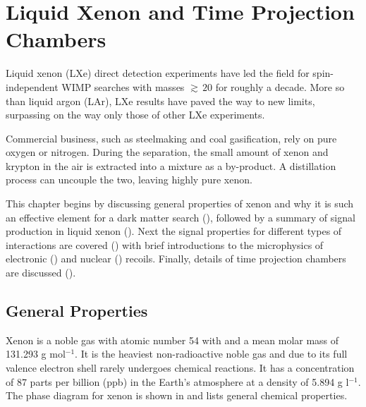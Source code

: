 

\pagestyle{cu}
\graphicspath{{./Chapter2/Figures/}}
\chapter[Liquid Xenon and Time Projection Chambers][Liquid Xenon and Time Projection Chambers]{Liquid Xenon and Time Projection Chambers}
\label{chap:liquid_xe}

Liquid xenon (LXe) direct detection experiments have led the field for spin-independent WIMP searches with masses ${\gtrsim}\, 20$ for
roughly a decade.  More so than liquid argon (LAr), LXe results have paved the way to new limits, surpassing on the way only those of
other LXe experiments.

Commercial business, such as steelmaking and coal gasification, rely on pure oxygen or nitrogen.  During the separation,
the small amount of xenon and krypton in the air is extracted into a mixture as a by-product.  A distillation process can uncouple
the two, leaving highly pure xenon.

This chapter begins by discussing general properties of xenon and why it is such an effective element for a dark matter search
(), followed by a summary of signal production in liquid xenon ().  Next the signal
properties for different types of interactions are covered () with brief introductions to the microphysics of
electronic () and nuclear () recoils.  Finally, details of time projection chambers are discussed
().

\section{General Properties}
\label{sec:properties}
Xenon is a noble gas with atomic number 54 with and a mean molar mass of 131.293 g mol$^{-1}$.  It is the heaviest non-radioactive noble
gas and due to its full valence electron
shell rarely undergoes chemical reactions.  It has a concentration of 87 parts per billion (ppb)
in the Earth's atmosphere at a density of
5.894 g l$^{-1}$.  The phase diagram for xenon is shown in  and  lists general
chemical properties.

